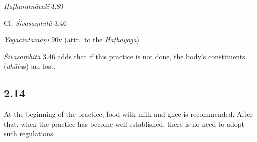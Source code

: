 \begin{ekdosis}
\begin{sources}[hp02_013]
\begin{versinnote}
\end{versinnote}
\end{sources}

\begin{testimonia}[hp02_013]
\emph{Haṭharatnāvalī} 3.89

\begin{versinnote}
\end{versinnote}

Cf. \emph{Śivasaṃhitā} 3.46

\begin{versinnote}
\end{versinnote}

\emph{Yogacintāmaṇi} 90v (attr.~to the \emph{Haṭhayoga})

\begin{versinnote}
\end{versinnote}
\end{testimonia}

\begin{philcomm}[hp02_013]
\emph{Śivasaṃhitā} 3.46 adds that if this practice is not done, the body's constituents (\emph{dhātu}s) are lost.
\end{philcomm}


\subsection*{2.14}
\begin{translation}[hp02_014]
At the beginning of the practice, food with milk and ghee is recommended. After that, when the practice has become well established, there is no need to adopt such regulations.
\end{translation}


\end{ekdosis}
